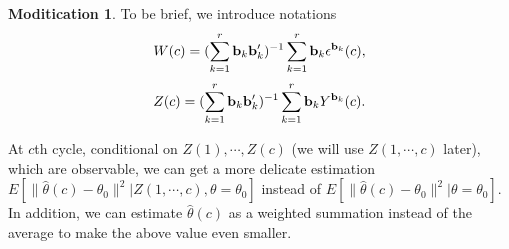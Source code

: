 \documentclass{article}
\theoremstyle{plain}
\theoremstyle{definition}
\newtheorem{modification}{Moditication}
\begin{document}

\begin{modification}




To be brief, we introduce notations
 \[W(c)=(\sum_{k=1}^{r}\bold{b}_k\bold{b}_k')^{-1}\sum_{k=1}^{r}\bold{b}_{k}\epsilon^{\bold{b}_k}(c),\] 
 \[Z(c) =(\sum_{k=1}^{r}\bold{b}_k\bold{b}_k')^{-1}\sum_{k=1}^{r}\bold{b}_{k}Y^{\bold{b}_k}(c).\] 

At $c$th cycle, conditional on $Z(1), \cdots, Z(c)$ (we will use $Z(1,\cdots, c)$ later), which are observable, we can get a more delicate estimation $E[\|\hat{\theta}(c)-\theta_0\|^2 | Z(1,\cdots, c), \theta = \theta_0]$ instead of $E[\|\hat{\theta}(c)-\theta_0\|^2|\theta=\theta_0]$. In addition, we can estimate $\hat{\theta}(c)$ as a weighted summation instead of the average to make the above value even smaller.


\end{modification}
\end{document}
